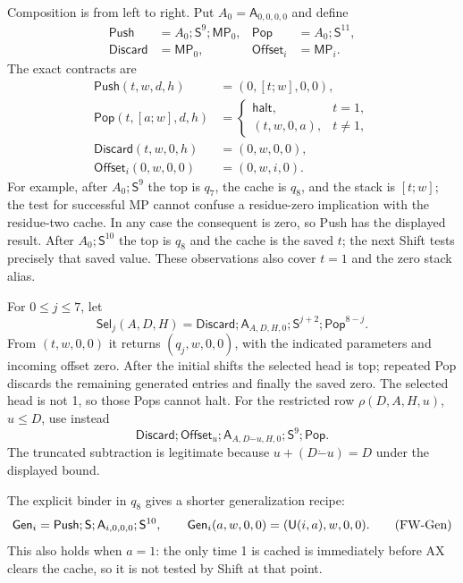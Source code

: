 Composition is from left to right.  Put $A_0=\mathsf A_{0,0,0,0}$ and
define
\begin{align*}
 \mathsf{Push}&=A_0;\mathsf S^9;\mathsf{MP}_0,&
 \mathsf{Pop}&=A_0;\mathsf S^{11},\\
 \mathsf{Discard}&=\mathsf{MP}_0,&
 \mathsf{Offset}_i&=\mathsf{MP}_i.
\end{align*}
The exact contracts are
\begin{align*}
 \mathsf{Push}(t,w,d,h)&=(0,[t;w],0,0),\\
 \mathsf{Pop}(t,[a;w],d,h)&=
   \begin{cases}\mathsf{halt},&t=1,\\(t,w,0,a),&t\ne1,\end{cases}\\
 \mathsf{Discard}(t,w,0,h)&=(0,w,0,0),\\
 \mathsf{Offset}_i(0,w,0,0)&=(0,w,i,0).                 \tag{FW-Words}
\end{align*}
For example, after $A_0;\mathsf S^9$ the top is $q_7$, the cache is
$q_8$, and the stack is $[t;w]$; the test for successful MP cannot
confuse a residue-zero implication with the residue-two cache.  In any
case the consequent is zero, so Push has the displayed result.  After
$A_0;\mathsf S^{10}$ the top is $q_8$ and the cache is the saved $t$;
the next Shift tests precisely that saved value.  These observations
also cover $t=1$ and the zero stack alias.

For $0\le j\le7$, let
\[
 \mathsf{Sel}_j(A,D,H)=\mathsf{Discard};
 \mathsf A_{A,D,H,0};\mathsf S^{j+2};\mathsf{Pop}^{8-j}.
                                                               \tag{FW-Sel}
\]
From $(t,w,0,0)$ it returns $(q_j,w,0,0)$, with the indicated
parameters and incoming offset zero.  After the initial shifts the
selected head is top; repeated Pop discards the remaining generated
entries and finally the saved zero.  The selected head is not 1, so
those Pops cannot halt.  For the restricted row $\rho(D,A,H,u)$,
$u\le D$, use instead
\[
 \mathsf{Discard};\mathsf{Offset}_u;
 \mathsf A_{A,D\mathbin{\dot-}u,H,0};\mathsf S^9;\mathsf{Pop}.
                                                               \tag{FW-Rho}
\]
The truncated subtraction is legitimate because
$u+(D\mathbin{\dot-}u)=D$ under the displayed bound.

The explicit binder in $q_8$ gives a shorter generalization recipe:
\[
 \mathsf{Gen}_i=\mathsf{Push};\mathsf S;
             \mathsf A_{i,0,0,0};\mathsf S^{10},
 \qquad
 \mathsf{Gen}_i(a,w,0,0)=(\mathsf U(i,a),w,0,0).              \tag{FW-Gen}
\]
This also holds when $a=1$: the only time 1 is cached is immediately
before AX clears the cache, so it is not tested by Shift at that point.

